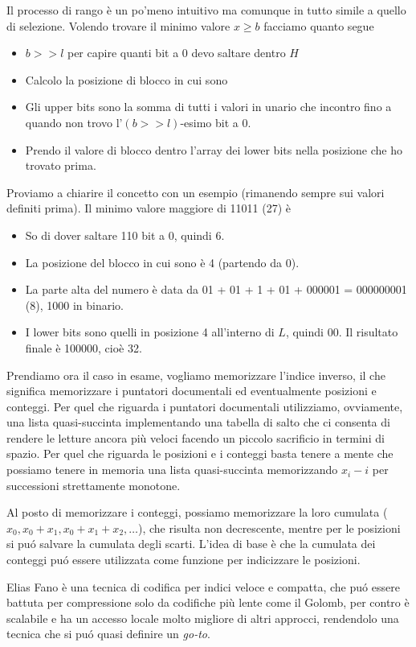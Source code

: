 Il processo di rango è un po'meno intuitivo ma comunque in tutto simile a quello di selezione. Volendo trovare il minimo valore $x \geq b$ facciamo quanto segue
\begin{itemize}
    \item $b >> l$ per capire quanti bit a 0 devo saltare dentro $H$
    \item Calcolo la posizione di blocco in cui sono
    \item Gli upper bits sono la somma di tutti i valori in unario che incontro fino a quando non trovo l'$(b >> l)$-esimo bit a 0.
    \item Prendo il valore di blocco dentro l'array dei lower bits nella posizione che ho trovato prima.
\end{itemize}
Proviamo a chiarire il concetto con un esempio (rimanendo sempre sui valori definiti prima). Il minimo valore maggiore di 11011 (27) è
\begin{itemize}
    \item So di dover saltare 110 bit a 0, quindi 6.
    \item La posizione del blocco in cui sono è 4 (partendo da 0).
    \item La parte alta del numero è data da 01 + 01 + 1 + 01 + 000001 = 000000001 (8), 1000 in binario.
    \item I lower bits sono quelli in posizione 4 all'interno di $L$, quindi 00. Il risultato finale è 100000, cioè 32.
\end{itemize}
Prendiamo ora il caso in esame, vogliamo memorizzare l'indice inverso, il che significa memorizzare i puntatori documentali ed eventualmente posizioni e conteggi. Per quel che riguarda i puntatori documentali utilizziamo, ovviamente, una lista quasi-succinta implementando una tabella di salto che ci consenta di rendere le letture ancora più veloci facendo un piccolo sacrificio in termini di spazio. Per quel che riguarda le posizioni e i conteggi basta tenere a mente che possiamo tenere in memoria una lista quasi-succinta memorizzando $x_i - i$  per successioni strettamente monotone.

Al posto di memorizzare i conteggi, possiamo memorizzare la loro cumulata ($x_0, x_0 + x_1, x_0 + x_1 + x_2, \dots$), che risulta non decrescente, mentre per le posizioni si puó salvare la cumulata degli scarti. L'idea di base è che la cumulata dei conteggi puó essere utilizzata come funzione per indicizzare le posizioni.

Elias Fano è una tecnica di codifica per indici veloce e compatta, che puó essere battuta per compressione solo da codifiche più lente come il Golomb, per contro è scalabile e ha un accesso locale molto migliore di altri approcci, rendendolo una tecnica che si puó quasi definire un \textit{go-to}.
